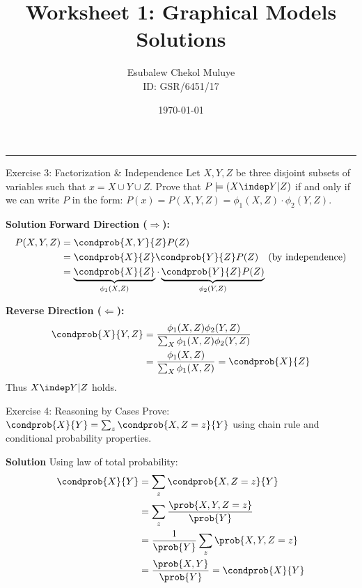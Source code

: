 \documentclass[11pt,a4paper]{article}
\title{\sffamily\bfseries\Huge Worksheet 1: Graphical Models \\ 
\Large Solutions \vspace{-0.2cm}}
\author{\sffamily\Large Esubalew Chekol Muluye \\ \small ID: GSR/6451/17}
\date{\sffamily\today}
\newenvironment{solution}
    {\par\medskip\noindent\textbf{\color{UMBlue}Solution}\quad\color{DarkGray}}
    {\par\medskip}
\begin{document}
\maketitle
\thispagestyle{empty}

\vspace{-1cm}
\begin{center}
\rule{0.8\textwidth}{0.5pt}
\end{center}

\clearpage

\begin{exercisebox}{Exercise 3: Factorization \& Independence}
Let $X, Y, Z$ be three disjoint subsets of variables such that $x = X \cup Y \cup Z$. Prove that $P \models (X \indep Y | Z)$ if and only if we can write $P$ in the form: $P(x) = P(X,Y,Z) = \phi_1(X,Z) \cdot \phi_2(Y,Z)$.

\begin{solution}
\textbf{Forward Direction ($\Rightarrow$):}
\begin{align*}
P(X,Y,Z) &= \condprob{X,Y}{Z}P(Z) \\
&= \condprob{X}{Z}\condprob{Y}{Z}P(Z) \quad \text{(by independence)} \\
&= \underbrace{\condprob{X}{Z}}_{\phi_1(X,Z)} \cdot \underbrace{\condprob{Y}{Z}P(Z)}_{\phi_2(Y,Z)}
\end{align*}

\textbf{Reverse Direction ($\Leftarrow$):}
\begin{align*}
\condprob{X}{Y,Z} &= \frac{\phi_1(X,Z)\phi_2(Y,Z)}{\sum_X \phi_1(X,Z)\phi_2(Y,Z)} \\
&= \frac{\phi_1(X,Z)}{\sum_X \phi_1(X,Z)} = \condprob{X}{Z}
\end{align*}
Thus $X \indep Y | Z$ holds.
\end{solution}
\end{exercisebox}

\begin{exercisebox}{Exercise 4: Reasoning by Cases}
Prove: $\condprob{X}{Y} = \sum_z \condprob{X, Z=z}{Y}$ using chain rule and conditional probability properties.

\begin{solution}
Using law of total probability:
\begin{align*}
\condprob{X}{Y} &= \sum_z \condprob{X,Z=z}{Y} \\
&= \sum_z \frac{\prob{X,Y,Z=z}}{\prob{Y}} \\
&= \frac{1}{\prob{Y}} \sum_z \prob{X,Y,Z=z} \\
&= \frac{\prob{X,Y}}{\prob{Y}} = \condprob{X}{Y}
\end{align*}
\end{solution}
\end{exercisebox}
\end{document}
